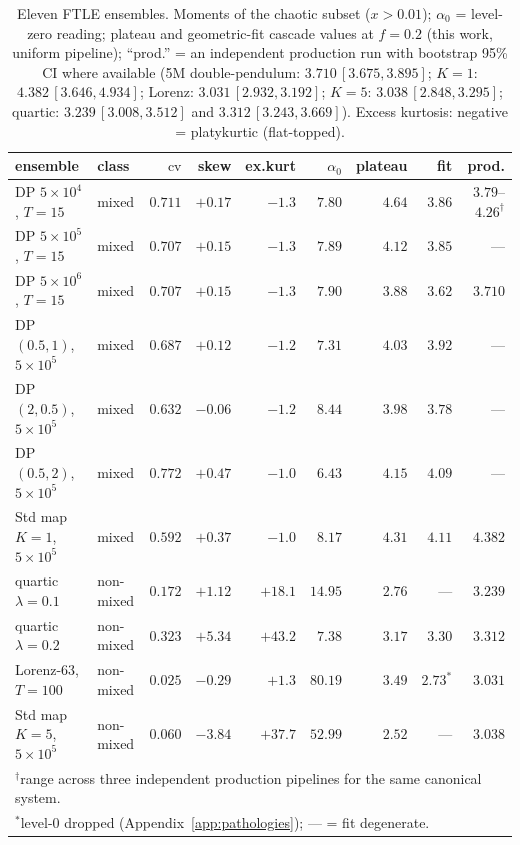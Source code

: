 \documentclass[11pt,a4paper]{article}
\theoremstyle{remark}
\newcommand{\cv}{\mathrm{cv}}
\begin{document}
\begin{table}[t]
\centering\footnotesize\setlength{\tabcolsep}{3.5pt}
\caption{Eleven FTLE ensembles. Moments of the chaotic subset ($x > 0.01$); $\alpha_0$ = level-zero
reading; plateau and geometric-fit cascade values at $f = 0.2$ (this work, uniform pipeline);
``prod.'' = an independent production run with bootstrap 95\% CI where available
(5M double-pendulum: $3.710\,[3.675, 3.895]$; $K{=}1$: $4.382\,[3.646, 4.934]$; Lorenz:
$3.031\,[2.932, 3.192]$; $K{=}5$: $3.038\,[2.848, 3.295]$; quartic: $3.239\,[3.008, 3.512]$ and
$3.312\,[3.243, 3.669]$). Excess kurtosis: negative = platykurtic (flat-topped).}
\label{tab:systems}
\begin{tabular}{llrrrrrrr}
\toprule
ensemble & class & $\cv$ & skew & ex.kurt & $\alpha_0$ & plateau & fit & prod.\\
\midrule
DP $5{\times}10^4$, $T{=}15$      & mixed & $0.711$ & $+0.17$ & $-1.3$ & $7.80$ & $4.64$ & $3.86$ & $3.79$--$4.26^{\dagger}$\\
DP $5{\times}10^5$, $T{=}15$      & mixed & $0.707$ & $+0.15$ & $-1.3$ & $7.89$ & $4.12$ & $3.85$ & ---\\
DP $5{\times}10^6$, $T{=}15$      & mixed & $0.707$ & $+0.15$ & $-1.3$ & $7.90$ & $3.88$ & $3.62$ & $3.710$\\
DP $(0.5,1)$, $5{\times}10^5$     & mixed & $0.687$ & $+0.12$ & $-1.2$ & $7.31$ & $4.03$ & $3.92$ & ---\\
DP $(2,0.5)$, $5{\times}10^5$     & mixed & $0.632$ & $-0.06$ & $-1.2$ & $8.44$ & $3.98$ & $3.78$ & ---\\
DP $(0.5,2)$, $5{\times}10^5$     & mixed & $0.772$ & $+0.47$ & $-1.0$ & $6.43$ & $4.15$ & $4.09$ & ---\\
Std map $K{=}1$, $5{\times}10^5$  & mixed & $0.592$ & $+0.37$ & $-1.0$ & $8.17$ & $4.31$ & $4.11$ & $4.382$\\
\midrule
quartic $\lambda{=}0.1$           & non-mixed & $0.172$ & $+1.12$ & $+18.1$ & $14.95$ & $2.76$ & --- & $3.239$\\
quartic $\lambda{=}0.2$           & non-mixed & $0.323$ & $+5.34$ & $+43.2$ & $7.38$ & $3.17$ & $3.30$ & $3.312$\\
Lorenz-63, $T{=}100$              & non-mixed & $0.025$ & $-0.29$ & $+1.3$ & $80.19$ & $3.49$ & $2.73^{*}$ & $3.031$\\
Std map $K{=}5$, $5{\times}10^5$  & non-mixed & $0.060$ & $-3.84$ & $+37.7$ & $52.99$ & $2.52$ & --- & $3.038$\\
\bottomrule
\multicolumn{9}{l}{\footnotesize $^{\dagger}$range across three independent production pipelines for
the same canonical system.}\\
\multicolumn{9}{l}{\footnotesize $^{*}$level-0 dropped (Appendix~\ref{app:pathologies});
--- = fit degenerate.}
\end{tabular}
\end{table}
\end{document}
